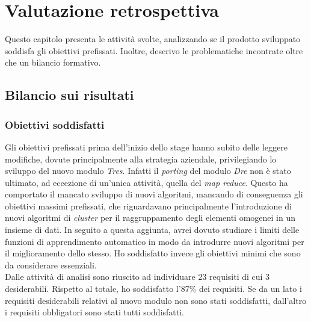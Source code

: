 
\chapter{Valutazione retrospettiva}
\label{cap:conclusioni}
Questo capitolo presenta le attività svolte, analizzando se il prodotto sviluppato soddisfa gli obiettivi prefissati. Inoltre, descrivo le problematiche incontrate oltre che un bilancio formativo.


\section{Bilancio sui risultati}

\subsection{Obiettivi soddisfatti}
Gli obiettivi prefissati prima dell'inizio dello stage hanno subito delle leggere modifiche, dovute principalmente alla strategia aziendale, privilegiando lo sviluppo del nuovo modulo \textit{Tres}. Infatti il \textit{porting} del modulo \textit{Dre} non è stato ultimato, ad eccezione di un'unica attività, quella del \textit{map reduce}. Questo ha comportato il mancato sviluppo di nuovi algoritmi, mancando di conseguenza gli obiettivi massimi prefissati, che riguardavano principalmente l'introduzione di nuovi algoritmi di \textit{cluster} per il raggruppamento degli elementi omogenei in un insieme di dati. In seguito a questa aggiunta, avrei dovuto studiare i limiti delle funzioni di apprendimento automatico in modo da introdurre nuovi algoritmi per il miglioramento dello stesso.
Ho soddisfatto invece gli obiettivi minimi che sono da considerare essenziali.\\
Dalle attività di analisi sono riuscito ad individuare 23 requisiti di cui 3 desiderabili. Rispetto al totale, ho soddisfatto l'87\% dei requisiti. Se da un lato i requisiti desiderabili relativi al nuovo modulo non sono stati soddisfatti, dall'altro i requisiti obbligatori sono stati tutti soddisfatti.\\


